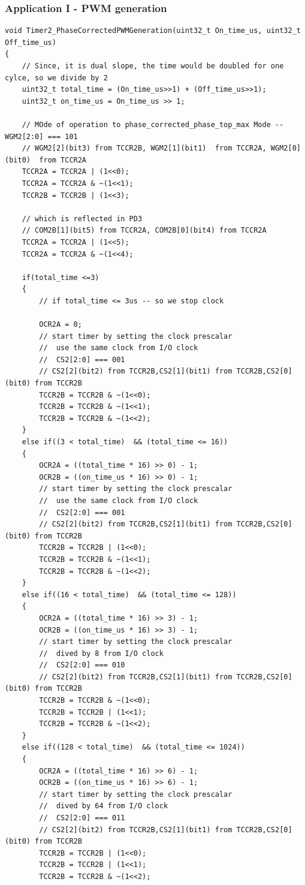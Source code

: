 \documentclass{article}
\begin{document}
\subsubsection{Application I - PWM generation}
\begin{verbatim}
void Timer2_PhaseCorrectedPWMGeneration(uint32_t On_time_us, uint32_t Off_time_us)
{
	// Since, it is dual slope, the time would be doubled for one cylce, so we divide by 2
	uint32_t total_time = (On_time_us>>1) + (Off_time_us>>1);
	uint32_t on_time_us = On_time_us >> 1;
		
	// MOde of operation to phase_corrected_phase_top_max Mode -- WGM2[2:0] === 101
	// WGM2[2](bit3) from TCCR2B, WGM2[1](bit1)  from TCCR2A, WGM2[0](bit0)  from TCCR2A
	TCCR2A = TCCR2A | (1<<0);
	TCCR2A = TCCR2A & ~(1<<1);
	TCCR2B = TCCR2B | (1<<3);	

	// which is reflected in PD3
	// COM2B[1](bit5) from TCCR2A, COM2B[0](bit4) from TCCR2A
	TCCR2A = TCCR2A | (1<<5);
	TCCR2A = TCCR2A & ~(1<<4);
	
	if(total_time <=3)
	{
		// if total_time <= 3us -- so we stop clock
		
		OCR2A = 0;
		// start timer by setting the clock prescalar
		//  use the same clock from I/O clock
		//  CS2[2:0] === 001
		// CS2[2](bit2) from TCCR2B,CS2[1](bit1) from TCCR2B,CS2[0](bit0) from TCCR2B
		TCCR2B = TCCR2B & ~(1<<0);
		TCCR2B = TCCR2B & ~(1<<1);
		TCCR2B = TCCR2B & ~(1<<2);
	}
	else if((3 < total_time)  && (total_time <= 16))
	{
		OCR2A = ((total_time * 16) >> 0) - 1;
		OCR2B = ((on_time_us * 16) >> 0) - 1;
		// start timer by setting the clock prescalar
		//  use the same clock from I/O clock
		//  CS2[2:0] === 001
		// CS2[2](bit2) from TCCR2B,CS2[1](bit1) from TCCR2B,CS2[0](bit0) from TCCR2B
		TCCR2B = TCCR2B | (1<<0);
		TCCR2B = TCCR2B & ~(1<<1);
		TCCR2B = TCCR2B & ~(1<<2);
	}
	else if((16 < total_time)  && (total_time <= 128))
	{
		OCR2A = ((total_time * 16) >> 3) - 1;
		OCR2B = ((on_time_us * 16) >> 3) - 1;
		// start timer by setting the clock prescalar
		//  dived by 8 from I/O clock
		//  CS2[2:0] === 010
		// CS2[2](bit2) from TCCR2B,CS2[1](bit1) from TCCR2B,CS2[0](bit0) from TCCR2B
		TCCR2B = TCCR2B & ~(1<<0);
		TCCR2B = TCCR2B | (1<<1);
		TCCR2B = TCCR2B & ~(1<<2);
	}
	else if((128 < total_time)  && (total_time <= 1024))
	{
		OCR2A = ((total_time * 16) >> 6) - 1;
		OCR2B = ((on_time_us * 16) >> 6) - 1;
		// start timer by setting the clock prescalar
		//  dived by 64 from I/O clock
		//  CS2[2:0] === 011
		// CS2[2](bit2) from TCCR2B,CS2[1](bit1) from TCCR2B,CS2[0](bit0) from TCCR2B
		TCCR2B = TCCR2B | (1<<0);
		TCCR2B = TCCR2B | (1<<1);
		TCCR2B = TCCR2B & ~(1<<2);
		

\end{verbatim}
\end{document}
